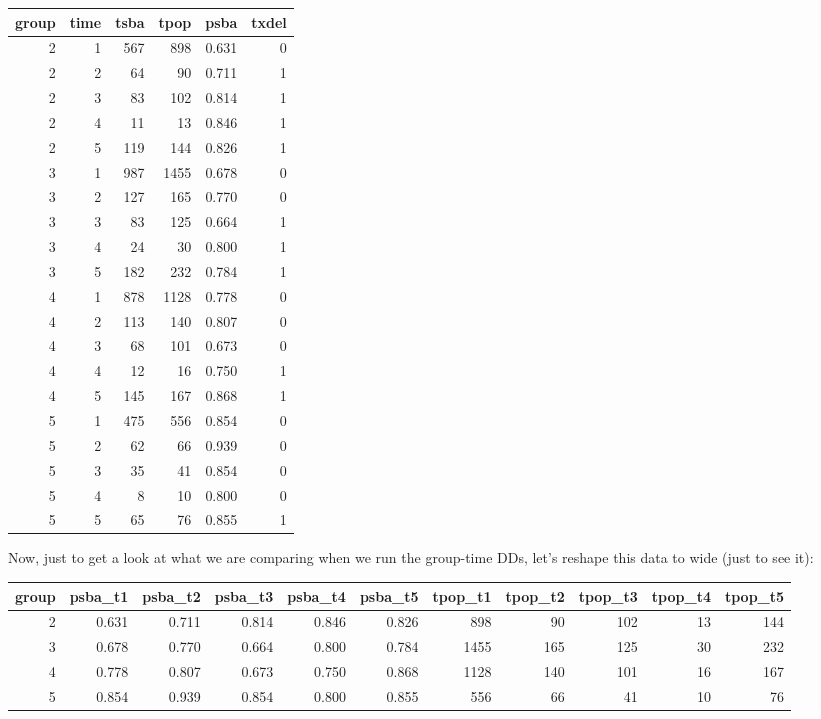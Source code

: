 \documentclass[
]{article}
\begin{document}
\begin{table}
\centering
\begin{tabular}[t]{r|r|r|r|r|r}
\hline
group & time & tsba & tpop & psba & txdel\\
\hline
2 & 1 & 567 & 898 & 0.631 & 0\\
\hline
2 & 2 & 64 & 90 & 0.711 & 1\\
\hline
2 & 3 & 83 & 102 & 0.814 & 1\\
\hline
2 & 4 & 11 & 13 & 0.846 & 1\\
\hline
2 & 5 & 119 & 144 & 0.826 & 1\\
\hline
3 & 1 & 987 & 1455 & 0.678 & 0\\
\hline
3 & 2 & 127 & 165 & 0.770 & 0\\
\hline
3 & 3 & 83 & 125 & 0.664 & 1\\
\hline
3 & 4 & 24 & 30 & 0.800 & 1\\
\hline
3 & 5 & 182 & 232 & 0.784 & 1\\
\hline
4 & 1 & 878 & 1128 & 0.778 & 0\\
\hline
4 & 2 & 113 & 140 & 0.807 & 0\\
\hline
4 & 3 & 68 & 101 & 0.673 & 0\\
\hline
4 & 4 & 12 & 16 & 0.750 & 1\\
\hline
4 & 5 & 145 & 167 & 0.868 & 1\\
\hline
5 & 1 & 475 & 556 & 0.854 & 0\\
\hline
5 & 2 & 62 & 66 & 0.939 & 0\\
\hline
5 & 3 & 35 & 41 & 0.854 & 0\\
\hline
5 & 4 & 8 & 10 & 0.800 & 0\\
\hline
5 & 5 & 65 & 76 & 0.855 & 1\\
\hline
\end{tabular}
\end{table}

Now, just to get a look at what we are comparing when we run the
group-time DDs, let's reshape this data to wide (just to see it):

\begin{table}
\centering
\begin{tabular}[t]{r|r|r|r|r|r|r|r|r|r|r}
\hline
group & psba_t1 & psba_t2 & psba_t3 & psba_t4 & psba_t5 & tpop_t1 & tpop_t2 & tpop_t3 & tpop_t4 & tpop_t5\\
\hline
2 & 0.631 & 0.711 & 0.814 & 0.846 & 0.826 & 898 & 90 & 102 & 13 & 144\\
\hline
3 & 0.678 & 0.770 & 0.664 & 0.800 & 0.784 & 1455 & 165 & 125 & 30 & 232\\
\hline
4 & 0.778 & 0.807 & 0.673 & 0.750 & 0.868 & 1128 & 140 & 101 & 16 & 167\\
\hline
5 & 0.854 & 0.939 & 0.854 & 0.800 & 0.855 & 556 & 66 & 41 & 10 & 76\\
\hline
\end{tabular}
\end{table}
\end{document}
